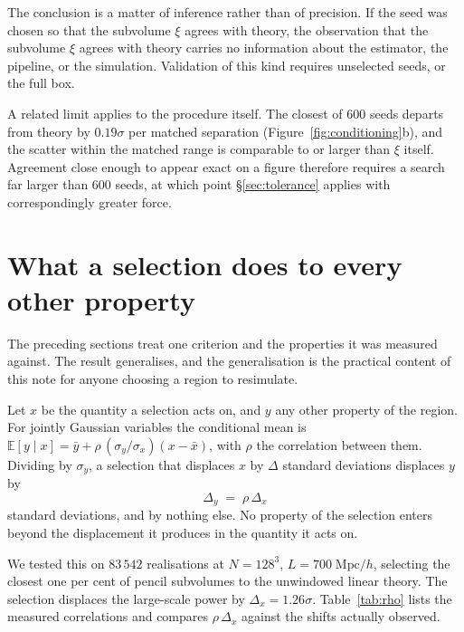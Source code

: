 \documentclass[12pt]{article}
\begin{document}
The conclusion is a matter of inference rather than of precision.  If the seed
was chosen so that the subvolume $\xi$ agrees with theory, the observation that
the subvolume $\xi$ agrees with theory carries no information about the
estimator, the pipeline, or the simulation.  Validation of this kind requires
unselected seeds, or the full box.

A related limit applies to the procedure itself.  The closest of 600 seeds
departs from theory by $0.19\sigma$ per matched separation
(Figure~\ref{fig:conditioning}b), and the scatter within the matched range is
comparable to or larger than $\xi$ itself.  Agreement close enough to appear
exact on a figure therefore requires a search far larger than 600 seeds, at
which point \S\ref{sec:tolerance} applies with correspondingly greater force.

\section{What a selection does to every other property}
\label{sec:conditioning-all}

The preceding sections treat one criterion and the properties it was
measured against.  The result generalises, and the generalisation is
the practical content of this note for anyone choosing a region to
resimulate.

Let $x$ be the quantity a selection acts on, and $y$ any other property
of the region.  For jointly Gaussian variables the conditional mean is
$\mathbb{E}[y \mid x] = \bar y + \rho\,(\sigma_y/\sigma_x)(x - \bar x)$,
with $\rho$ the correlation between them.  Dividing by $\sigma_y$, a
selection that displaces $x$ by $\Delta$ standard deviations displaces
$y$ by
\begin{equation}
  \label{eq:rho-delta}
  \Delta_y \;=\; \rho \, \Delta_x
\end{equation}
standard deviations, and by nothing else.  No property of the selection
enters beyond the displacement it produces in the quantity it acts on.

We tested this on $83\,542$ realisations at $N = 128^3$,
$L = 700\;\mathrm{Mpc}/h$, selecting the closest one per cent of pencil
subvolumes to the unwindowed linear theory.  The selection displaces the
large-scale power by $\Delta_x = 1.26\sigma$.  Table~\ref{tab:rho} lists
the measured correlations and compares $\rho\,\Delta_x$ against the
shifts actually observed.
\end{document}
